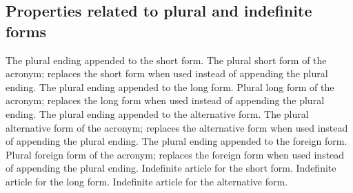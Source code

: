 \documentclass{acro-manual}
\begin{document}
\subsection{Properties related to plural and indefinite forms}\label{sec:prop-relat-plur}
\begin{properties}
    The plural ending appended to the short form.
  \Default
    The plural short form of the acronym; replaces the short form when used
    instead of appending the plural ending.
    The plural ending appended to the long form.
  \Default
    Plural long form of the acronym; replaces the long form when used
    instead of appending the plural ending.
    The plural ending appended to the alternative form.
  \Default
    The plural alternative form of the acronym; replaces the alternative form
    when used instead of appending the plural ending.
    The plural ending appended to the foreign form.
  \Default
    Plural foreign form of the acronym; replaces the foreign form when used
    instead of appending the plural ending.
    Indefinite article for the short form.
    Indefinite article for the long form.
    Indefinite article for the alternative form.
\end{properties}
\end{document}
